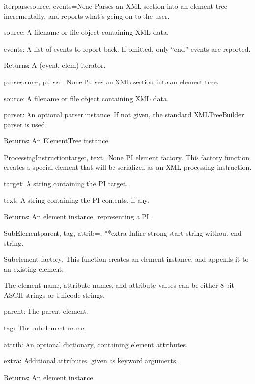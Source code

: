 \begin{funcdesc}{iterparse}{source, events=None}
Parses an XML section into an element tree incrementally, and reports
what's going on to the user.

source: A filename or file object containing XML data.

events: A list of events to report back.  If omitted, only ``end''
events are reported.

Returns: A (event, elem) iterator.
\end{funcdesc}

\begin{funcdesc}{parse}{source, parser=None}
Parses an XML section into an element tree.

source: A filename or file object containing XML data.

parser: An optional parser instance.  If not given, the
standard XMLTreeBuilder parser is used.

Returns: An ElementTree instance
\end{funcdesc}

\begin{funcdesc}{ProcessingInstruction}{target, text=None}
PI element factory.  This factory function creates a special element
that will be serialized as an XML processing instruction.

target: A string containing the PI target.

text: A string containing the PI contents, if any.

Returns: An element instance, representing a PI.
\end{funcdesc}

\begin{funcdesc}{SubElement}{parent, tag, attrib={}, **extra}
Inline strong start-string without end-string.


Subelement factory.  This function creates an element instance, and
appends it to an existing element.

The element name, attribute names, and attribute values can be
either 8-bit ASCII strings or Unicode strings.

parent: The parent element.

tag: The subelement name.

attrib: An optional dictionary, containing element attributes.

extra: Additional attributes, given as keyword arguments.

Returns: An element instance.
\end{funcdesc}

